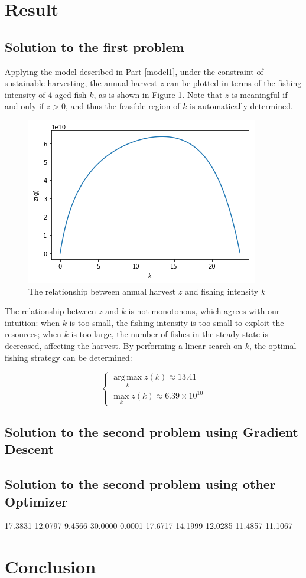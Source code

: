 \documentclass{IEEEtran}
\DeclareMathOperator*{\argmax}{arg\,max}
\begin{document}
\section{Result}

\subsection{Solution to the first problem}

Applying the model described in Part \ref{model1}, under the constraint of sustainable harvesting, the annual harvest $z$ can be plotted in terms of the fishing intensity of 4-aged fish $k$, as is shown in Figure \ref{plot1}. Note that $z$ is meaningful if and only if $z>0$, and thus the feasible region of $k$ is automatically determined.

\begin{figure}[h]
	\includegraphics[width=\columnwidth]{plot1}
	\caption{The relationship between annual harvest $z$ and fishing intensity $k$\label{plot1}}
\end{figure}

The relationship between $z$ and $k$ is not monotonous, which agrees with our intuition: when $k$ is too small, the fishing intensity is too small to exploit the resources; when $k$ is too large, the number of fishes in the steady state is decreased, affecting the harvest. By performing a linear search on $k$, the optimal fishing strategy can be determined:

$$\begin{cases}\argmax\limits_k z(k) \approx 13.41\\\max\limits_k z(k) \approx 6.39\times 10^{10} \end{cases}$$

\subsection{Solution to the second problem using Gradient Descent}
\subsection{Solution to the second problem using other Optimizer}
17.3831   12.0797    9.4566   30.0000    0.0001
17.6717   14.1999   12.0285   11.4857   11.1067
\section{Conclusion}
\end{document}
